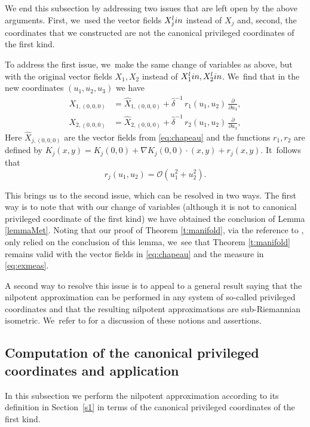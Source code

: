 \documentclass[11pt]{article}
\newcommand{\Subsection}{\subsection}
\newcommand{\lin}{\textup{lin}}
\theoremstyle{definition}
\newcommand{\1}{\mathbbm{1}}
\numberwithin{equation}{section}
\begin{document}
We end this subsection by addressing two issues that are left open by the above arguments. First, we~used the vector fields $X_j^\lin$ instead of $X_j$ and, second, the coordinates that we constructed are not the canonical privileged coordinates of the first kind.

To address the first issue, we~make the same change of variables as above, but with the original vector fields $X_1,X_2$ instead of $X_1^\lin,X_2^\lin$. We~find that in the new coordinates $(u_1,u_2,u_3)$ we have
\begin{align*}
X_{1,(0,0,0)} & = \widehat X_{1,(0,0,0)} + \widehat\delta^{-1} \,r_1(u_1,u_2) \,\frac{\partial}{\partial u_3},\\
X_{2,(0,0,0)} & = \widehat X_{2,(0,0,0)} + \widehat\delta^{-1} \,r_2(u_1,u_2) \,\frac{\partial}{\partial u_3},
\end{align*}
Here $\widehat X_{j,(0,0,0)}$ are the vector fields from \eqref{eq:chapeau} and the functions $r_1,r_2$ are defined by $K_j(x,y)= K_j(0,0) + \nabla K_j(0,0) \cdot (x, y) + r_{j} (x,y)$. It~follows that
\[
r_{j}(u_1,u_2) = \mathcal O (u_1^2 + u_2^2).
\]

This brings us to the second issue, which can be resolved in two ways. The first way is to note that with our change of variables (although it is not to canonical privileged coordinate of the first kind) we have obtained the conclusion of Lemma \ref{lemmaMet}. Noting that our proof of Theorem \ref{t:manifold}, via the reference to \cite{Rot}, only relied on the conclusion of this lemma, we~see that Theorem \ref{t:manifold} remains valid with the vector fields in \eqref{eq:chapeau} and the measure in \eqref{eq:exmeas}.

A second way to resolve this issue is to appeal to a general result saying that the nilpotent approximation can be performed in any system of so-called privileged coordinates and that the resulting nilpotent approximations are sub-Riemannian isometric. We~refer to \cite[\S A.5.4]{CHT1} for a discussion of these notions and assertions.

\Subsection{Computation of the canonical privileged coordinates and application}
In this subsection we perform the nilpotent approximation according to its definition in Section~\ref{s1} in terms of the canonical privileged coordinates of the first kind.
\end{document}
